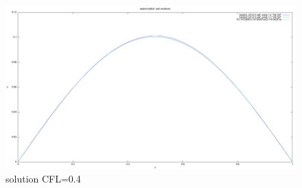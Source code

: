 \documentclass[final]{cvpr}
\begin{document}
\begin{figure}[htbp]
	\centering
	\includegraphics[scale=0.15]{./figures/solution_CFL0.4.png}
	\caption{solution CFL=0.4}
	\label{figure}
\end{figure}

\end{document}
